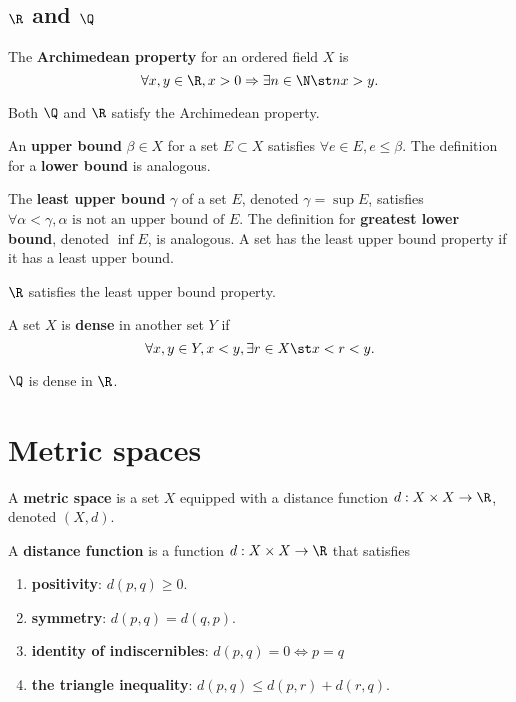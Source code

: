 \documentclass{notes}
\renewcommand{\emph}[1]{\textbf{#1}}
\begin{document}
\subsection{$\R$ and $\Q$}
\begin{defn}
  The \emph{Archimedean property} for an ordered field $X$ is $$\forall x, y \in \R, x > 0 
\Rightarrow \exists n \in \N \st nx > y.$$
\end{defn}
\begin{theorem}
  Both $\Q$ and $\R$ satisfy the Archimedean property.
\end{theorem}

\begin{defn}
  An \emph{upper bound} $\beta \in X$ for a set $E \subset X$ satisfies $\forall e \in E, e \leq \beta$.
The definition for a \emph{lower bound} is analogous.
\end{defn}
\begin{defn}
  The \emph{least upper bound} $\gamma$ of a set $E$, denoted $\gamma = \sup E$, satisfies $\forall
\alpha < \gamma, \alpha \text{ is not an upper bound of } E.$ The definition for \emph{greatest 
lower bound}, denoted $\inf E$, is analogous. A set has the least upper bound property if it has a
least upper bound.
\end{defn}
\begin{theorem}
  $\R$ satisfies the least upper bound property.
\end{theorem}

\begin{defn}
  A set $X$ is \emph{dense} in another set $Y$ if $$\forall x,y \in Y, x < y, \exists r \in X \st 
x < r < y.$$
\end{defn}
\begin{theorem}
  $\Q$ is dense in $\R$.
\end{theorem}

\section{Metric spaces}
\begin{defn}
  A \emph{metric space} is a set $X$ equipped with a distance function $d: X\times X \to \R$, denoted
$(X, d)$.
\end{defn}

\begin{defn}
  A \emph{distance function} is a function $d: X \times X \to \R$ that satisfies
\begin{enumerate}
  \item \emph{positivity}: $d(p,q) \geq 0$.
  \item \emph{symmetry}: $d(p,q) = d(q,p)$.
  \item \emph{identity of indiscernibles}: $d(p,q) = 0 \iff p = q$
  \item \emph{the triangle inequality}: $d(p,q) \leq d(p,r) + d(r, q)$.
\end{enumerate}
\end{defn}
\end{document}
